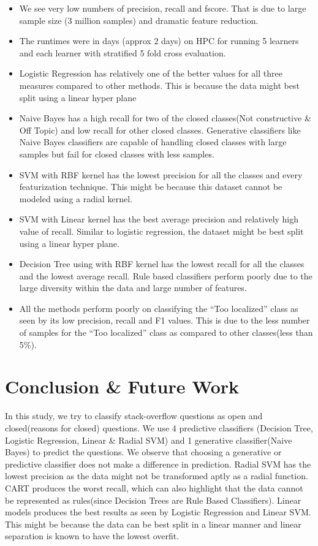 \documentclass{article} %
\begin{document}
\begin{itemize}
    \item We see very low numbers of precision, recall and fscore. That is due to large sample size (3 million samples) and dramatic feature reduction.
    \item The runtimes were in days (approx 2 days) on HPC for running 5 learners and each learner with stratified 5 fold cross evaluation.
    \item Logistic Regression has relatively one of the better values for all three measures compared to other methods. This is because the data might best split using a linear hyper plane
    \item Naive Bayes has a high recall for two of the closed classes(Not constructive \& Off Topic) and low recall for other closed classes. Generative classifiers like Naive Bayes classifiers are capable of handling closed classes with large samples but fail for closed classes with less samples.
    \item SVM with RBF kernel has the lowest precision for all the classes and every featurization technique. This might be because this dataset cannot be modeled using a radial kernel.
    \item SVM with Linear kernel has the best average precision and relatively high value of recall. Similar to logistic regression, the dataset might be best split using a linear hyper plane.
    \item Decision Tree using with RBF kernel has the lowest recall for all the classes and the lowest average recall. Rule based classifiers perform poorly due to the large diversity within the data and large number of features.
    \item All the methods perform poorly on classifying the ``Too localized'' class as seen by its low precision, recall and F1 values. This is due to the less number of samples for the ``Too localized'' class as compared to other classes(less than 5\%).
\end{itemize}

\section{Conclusion \& Future Work}

In this study, we try to classify stack-overflow questions as open and closed(reasons for closed) questions. We use 4 predictive classifiers (Decision Tree, Logistic Regression, Linear \& Radial SVM) and 1 generative classifier(Naive Bayes) to predict the questions. We observe that choosing a generative or predictive classifier does not make a difference in prediction. Radial SVM has the lowest precision as the data might not be transformed aptly as a  radial function. CART produces the worst recall, which can also highlight that the data cannot be represented as rules(since Decision Trees are Rule Based Classifiers). Linear models produces the best results as seen by Logistic Regression and Linear SVM. This might be because the data can be best split in a linear manner and linear separation is known to have the lowest overfit.
\end{document}
